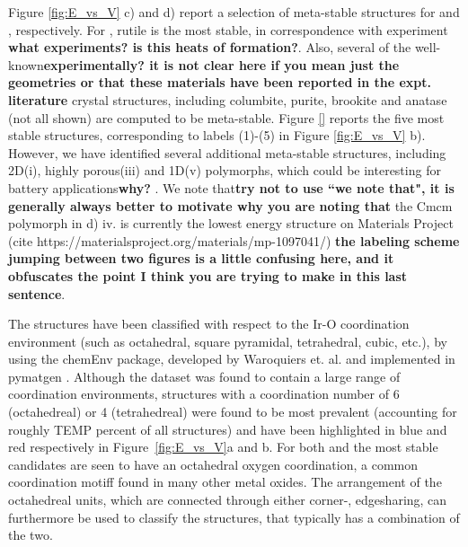 Figure \ref{fig:E_vs_V} c) and d) report a selection of meta-stable structures for \IrOtwo and \IrOthree, respectively. For \IrOtwo, rutile is the most stable, in correspondence with experiment \cite{}\textbf{what experiments?  is this  heats of formation?}. Also, several of the well-known\textbf{experimentally?  it is not clear here if you mean just the geometries or that these materials have been reported in the expt. literature} crystal structures, including  columbite, purite, brookite and anatase (not all shown) are computed to be meta-stable.
Figure \ref{} reports the five most stable \IrOthree structures, corresponding to labels (1)-(5) in Figure \ref{fig:E_vs_V} b). However, we have identified several additional meta-stable structures, including 2D(i), highly porous(iii) and 1D(v) polymorphs, which could be interesting for battery applications\textbf{why?} \cite{}. We note that\textbf{try not to use ``we note that", it is generally always better to motivate why you are noting that} the Cmcm polymorph in d) iv. is currently the lowest energy structure on Materials Project (cite https://materialsproject.org/materials/mp-1097041/) \cite{} \textbf{the labeling scheme jumping between two figures is a little confusing here, and it obfuscates the point I think you are trying to make in this last sentence}.


%
The structures have been classified with respect to the Ir-O coordination environment
(such as octahedral, square pyramidal, tetrahedral, cubic, etc.),
by using the chemEnv package, developed by Waroquiers et. al. \cite{Waroquiers2017} and implemented in pymatgen \cite{Ong2013}.
%
Although the dataset was found to contain a large range of coordination environments,
structures with a coordination number of 6 (octahedreal) or 4 (tetrahedreal) were found to be most prevalent
(accounting for roughly TEMP percent of all structures)
and have been highlighted in blue and red respectively in Figure~\ref{fig:E_vs_V}a and b.
%
For both \IrOtwo and \IrOthree the most stable candidates are seen to have an octahedral oxygen coordination,
a common coordination motiff found in many other metal oxides.\cite{Waroquiers2017}
%
The arrangement of the octahedreal units, which are connected through either corner-, edgesharing,
can furthermore be used to classify the structures, that typically has a combination of the two.


